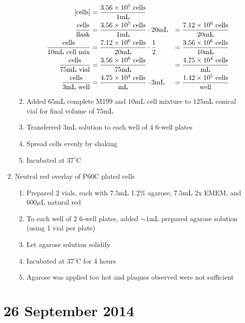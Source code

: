 \begin{enumerate}
\begin{enumerate}
				\begin{align*}
				\text{[cells]} &= \frac{3.56\times 10^{5}\text{ cells}}{1\text{mL}} \\
				\frac{\text{cells}}{\text{flask}} &= \frac{3.56\times 10^{5}\text{ cells}}{1\text{mL}} \cdot 20\text{mL} &= \frac{7.12\times 10^{6}\text{ cells}}{20\text{mL}}\\
				\frac{\text{cells}}{10\text{mL cell mix}} &= \frac{7.12\times 10^{6}\text{ cells}}{20\text{mL}}\cdot \frac{1}{2} &= \frac{3.56\times 10^{6}\text{ cells}}{10\text{mL}}\\
				\frac{\text{cells}}{75\text{mL vial}} &= \frac{3.56\times 10^{6}\text{ cells}}{75\text{mL}} &= \frac{4.75\times 10^{4}\text{ cells}}{\text{mL}}\\
				\frac{\text{cells}}{3\text{mL well}} &= \frac{4.75\times 10^{4}\text{ cells}}{\text{mL}} \cdot 3\text{mL} &= \frac{1.42\times 10^{5}\text{ cells}}{\text{well}}\\
				\end{align*}
			\item Added $65$mL complete M199 and $10$mL cell mixture to $125$mL conical vial for final volume of $75$mL
			\item Transferred $3$mL solution to each well of 4 6-well plates
			\item Spread cells evenly by shaking
			\item Incubated at $37^{\circ}$C
		\end{enumerate}
	\item Neutral red overlay of P60C plated cells
		\begin{enumerate}
			\item Prepared 2 vials, each with $7.5$mL 1.2\% agarose, $7.5$mL 2x EMEM, and $600\mu$L natural red
			\item To each well of 2 6-well plates, added $\sim 1$mL prepared agarose solution (using 1 vial per plate)
			\item Let agarose solution solidify
			\item Incubated at $37^{\circ}$C for 4 hours
			\item Agarose was applied too hot and plaques observed were not sufficient
		\end{enumerate}
\end{enumerate}

\section*{26 September 2014}

